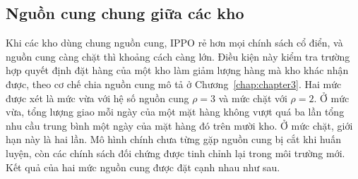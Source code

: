\subsection{Nguồn cung chung giữa các kho}
\label{subsec:doBenNguonCung}

Khi các kho dùng chung nguồn cung, IPPO rẻ hơn mọi chính sách cổ điển, và nguồn cung càng chặt thì khoảng cách càng lớn. Điều kiện này kiểm tra trường hợp quyết định đặt hàng của một kho làm giảm lượng hàng mà kho khác nhận được, theo cơ chế chia nguồn cung mô tả ở Chương~\ref{chap:chapter3}. Hai mức được xét là mức vừa với hệ số nguồn cung $\rho = 3$ và mức chặt với $\rho = 2$. Ở mức vừa, tổng lượng giao mỗi ngày của một mặt hàng không vượt quá ba lần tổng nhu cầu trung bình một ngày của mặt hàng đó trên mười kho. Ở mức chặt, giới hạn này là hai lần. Mô hình chính chưa từng gặp nguồn cung bị cắt khi huấn luyện, còn các chính sách đối chứng được tinh chỉnh lại trong môi trường mới. Kết quả của hai mức nguồn cung được đặt cạnh nhau như sau.

